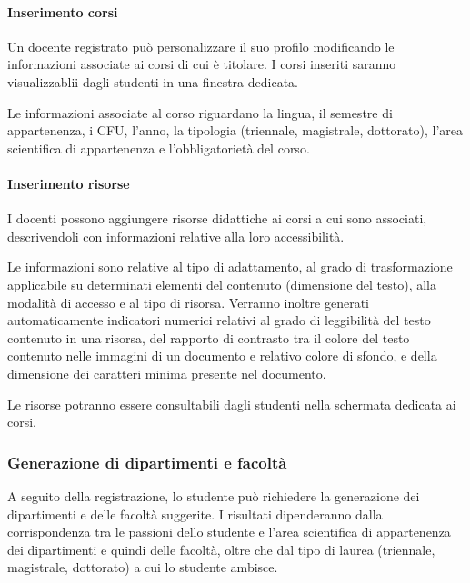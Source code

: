\paragraph{Inserimento corsi}
Un docente registrato può personalizzare il suo profilo modificando le informazioni associate ai corsi di cui è titolare. I corsi inseriti saranno visualizzablii dagli studenti in una finestra dedicata.

Le informazioni associate al corso riguardano la lingua, il semestre di appartenenza, i CFU, l'anno, la tipologia (triennale, magistrale, dottorato), l'area scientifica di appartenenza e l'obbligatorietà del corso.

\paragraph{Inserimento risorse}
I docenti possono aggiungere risorse didattiche ai corsi a cui sono associati, descrivendoli con informazioni relative alla loro accessibilità.

Le informazioni sono relative al tipo di adattamento, al grado di trasformazione applicabile su determinati elementi del contenuto (dimensione del testo), alla modalità di accesso e al tipo di risorsa. Verranno inoltre generati automaticamente indicatori numerici relativi al grado di leggibilità del testo contenuto in una risorsa, del rapporto di contrasto tra il colore del testo contenuto nelle immagini di un documento e relativo colore di sfondo, e della dimensione dei caratteri minima presente nel documento.

Le risorse potranno essere consultabili dagli studenti nella schermata dedicata ai corsi.

\subsubsection{Generazione di dipartimenti e facoltà}
A seguito della registrazione, lo studente può richiedere la generazione dei dipartimenti e delle facoltà suggerite. I risultati dipenderanno dalla corrispondenza tra le passioni dello studente e l'area scientifica di appartenenza dei dipartimenti e quindi delle facoltà, oltre che dal tipo di laurea (triennale, magistrale, dottorato) a cui lo studente ambisce.

